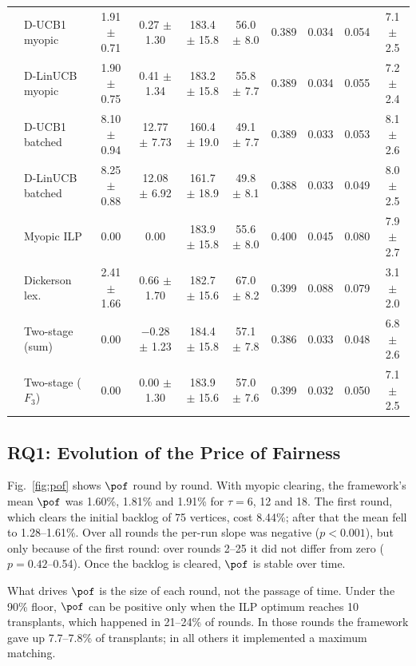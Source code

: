\begin{table}[!t]
\begin{tabular}{@{}cl cccccccc@{}}
 & D-UCB1 myopic      & 1.91 $\pm$ 0.71 & 0.27 $\pm$ 1.30   & 183.4 $\pm$ 15.8 & 56.0 $\pm$ 8.0 & 0.389 & 0.034 & 0.054 & 7.1 $\pm$ 2.5 \\
 & D-LinUCB myopic    & 1.90 $\pm$ 0.75 & 0.41 $\pm$ 1.34   & 183.2 $\pm$ 15.8 & 55.8 $\pm$ 7.7 & 0.389 & 0.034 & 0.055 & 7.2 $\pm$ 2.4 \\
 & D-UCB1 batched     & 8.10 $\pm$ 0.94 & 12.77 $\pm$ 7.73  & 160.4 $\pm$ 19.0 & 49.1 $\pm$ 7.7 & 0.389 & 0.033 & 0.053 & 8.1 $\pm$ 2.6 \\
 & D-LinUCB batched   & 8.25 $\pm$ 0.88 & 12.08 $\pm$ 6.92  & 161.7 $\pm$ 18.9 & 49.8 $\pm$ 8.1 & 0.388 & 0.033 & 0.049 & 8.0 $\pm$ 2.5 \\
 & Myopic ILP         & 0.00            & 0.00              & 183.9 $\pm$ 15.8 & 55.6 $\pm$ 8.0 & 0.400 & 0.045 & 0.080 & 7.9 $\pm$ 2.7 \\
 & Dickerson lex.     & 2.41 $\pm$ 1.66 & 0.66 $\pm$ 1.70   & 182.7 $\pm$ 15.6 & 67.0 $\pm$ 8.2 & 0.399 & 0.088 & 0.079 & 3.1 $\pm$ 2.0 \\
 & Two-stage (sum)    & 0.00            & $-$0.28 $\pm$ 1.23 & 184.4 $\pm$ 15.8 & 57.1 $\pm$ 7.8 & 0.386 & 0.033 & 0.048 & 6.8 $\pm$ 2.6 \\
 & Two-stage ($F_3$)  & 0.00            & 0.00 $\pm$ 1.30   & 183.9 $\pm$ 15.6 & 57.0 $\pm$ 7.6 & 0.399 & 0.032 & 0.050 & 7.1 $\pm$ 2.5 \\
\bottomrule
\end{tabular}
\end{table}

\subsection{RQ1: Evolution of the Price of Fairness}
\label{sec:results:rq1}

Fig.~\ref{fig:pof} shows $\pof$ round by round. With myopic clearing,
the framework's mean $\pof$ was 1.60\%, 1.81\% and 1.91\% for
$\tau = 6$, 12 and 18. The first round, which clears the initial
backlog of 75 vertices, cost 8.44\%; after that the mean fell to
1.28--1.61\%. Over all rounds the per-run slope was negative
($p < 0.001$), but only because of the first round: over rounds 2--25
it did not differ from zero ($p = 0.42$--0.54). Once the backlog is
cleared, $\pof$ is stable over time.

What drives $\pof$ is the size of each round, not the passage of
time. Under the 90\% floor, $\pof$ can be positive only when the ILP
optimum reaches 10 transplants, which happened in 21--24\% of rounds.
In those rounds the framework gave up 7.7--7.8\% of transplants; in
all others it implemented a maximum matching.

